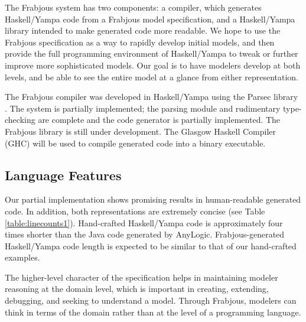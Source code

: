 \documentclass{sig-alternate}
\begin{document}
The Frabjous system has two components: a compiler, which generates Haskell/Yampa code from a Frabjous model specification, and a Haskell/Yampa library intended to make generated code more readable. We hope to use the Frabjous specification as a way to rapidly develop initial models, and then provide the full programming environment of Haskell/Yampa to tweak or further improve more sophisticated models. Our goal is to have modelers develop at both levels, and be able to see the entire model at a glance from either representation.



The Frabjous compiler was developed in Haskell/Yampa using the Parsec library \cite{parsec}. The system is partially implemented; the parsing module and rudimentary type-checking are complete and the code generator is partially implemented. The Frabjous library is still under development. The Glasgow Haskell Compiler (GHC) will be used to compile generated code into a binary executable.

\subsection{Language Features}

Our partial implementation shows promising results in human-readable generated code. In addition, both representations are extremely concise (see Table \ref{table:linecounts1}). Hand-crafted Haskell/Yampa code is approximately four times shorter than the Java code generated by AnyLogic. Frabjous-generated Haskell/Yampa code length is expected to be similar to that of our hand-crafted examples.


The higher-level character of the specification helps in maintaining modeler reasoning at the domain level, which is important in creating, extending, debugging, and seeking to understand a model. Through Frabjous, modelers can think in terms of the domain rather than at the level of a programming language.
\end{document}
